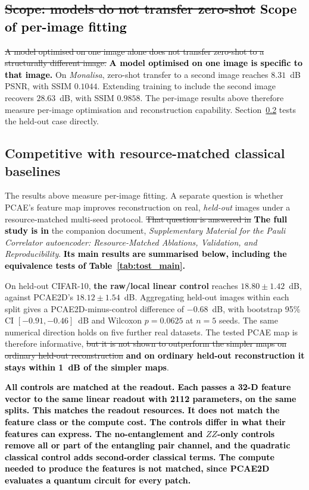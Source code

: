 \documentclass[pdflatex,sn-basic]{sn-jnl}
\newcommand{\snew}[1]{\textbf{\textcolor{studentgreen}{#1}}}
\newcommand{\del}[1]{\sout{#1}}
\newcommand{\add}[1]{\textbf{\textcolor{black}{#1}}}
\begin{document}
\subsection[Scope of per-image fitting]{\del{Scope: models do not transfer zero-shot} \add{Scope of per-image fitting}}
\label{sec:no_generalization}

\del{A model optimised on one image alone does not transfer zero-shot to a
structurally different image.} \add{A model optimised on one image is specific
to that image.} On \textit{Monalisa}, zero-shot transfer to a
second image reaches $8.31$~dB PSNR, with SSIM $0.1044$. Extending training to
include the second image recovers $28.63$~dB, with SSIM $0.9858$. The per-image
results above therefore measure per-image optimisation and reconstruction
capability. Section~\ref{sec:ablation_relationship} tests the held-out case
directly.

\color{black}

\subsection{Competitive with resource-matched classical baselines}
\label{sec:ablation_relationship}
\color{green}
The results above measure per-image fitting. A separate question is whether
PCAE's feature map improves reconstruction on real, \emph{held-out} images under
a resource-matched multi-seed protocol. \del{That question is answered in} \add{The full study is in} the
companion document, \textit{Supplementary Material for the Pauli Correlator autoencoder: Resource-Matched Ablations, Validation, and Reproducibility}. \add{Its
main results are summarised below, including the equivalence tests of
Table~\ref{tab:tost_main}.}

On held-out CIFAR-10, \snew{the raw/local linear control} reaches
$18.80\pm1.42$~dB, against PCAE2D's $18.12\pm1.54$~dB. Aggregating held-out
images within each split gives a PCAE2D-minus-control difference of $-0.68$~dB,
with bootstrap 95\% CI $[-0.91,-0.46]$~dB and Wilcoxon $p=0.0625$ at $n=5$
seeds. The same numerical direction holds on five further real datasets. The
tested PCAE map is therefore informative, \del{but it is not shown to outperform the
simpler maps on ordinary held-out reconstruction} \add{and on ordinary held-out
reconstruction it stays within 1~dB of the simpler maps}.

\add{All controls are matched at the readout. Each passes a 32-D feature vector
to the same linear readout with 2112 parameters, on the same splits. This
matches the readout resources. It does not match the feature class or the
compute cost. The controls differ in what their features can express. The
no-entanglement and $ZZ$-only controls remove all or part of the entangling
pair channel, and the quadratic classical control adds second-order classical
terms. The compute needed to produce the features is not matched, since PCAE2D
evaluates a quantum circuit for every patch.}
\end{document}
